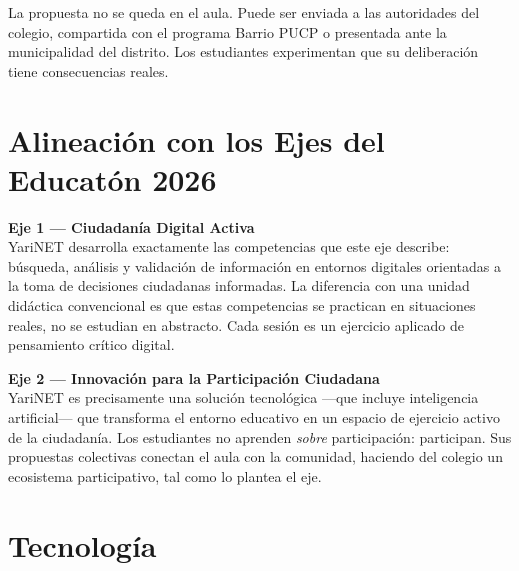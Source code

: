 \documentclass[a4paper, 11pt]{article}
\begin{document}
La propuesta no se queda en el aula. Puede ser enviada a las autoridades
del colegio, compartida con el programa Barrio PUCP o presentada ante
la municipalidad del distrito. Los estudiantes experimentan que su
deliberaci\'{o}n tiene consecuencias reales.

\section{Alineación con los Ejes del Educatón 2026}

\begin{tcolorbox}[
  enhanced,
  colback=ylightgray,
  colframe=ygold,
  arc=3mm,
  boxrule=1.2pt,
  left=12pt, right=12pt, top=10pt, bottom=10pt
]
\textbf{\color{yblue}Eje 1 — Ciudadan\'{i}a Digital Activa}\\[5pt]
{\color{ygray}
YariNET desarrolla exactamente las competencias que este eje describe:
b\'{u}squeda, an\'{a}lisis y validaci\'{o}n de informaci\'{o}n en entornos
digitales orientadas a la toma de decisiones ciudadanas informadas.
La diferencia con una unidad did\'{a}ctica convencional es que estas
competencias se practican en situaciones reales, no se estudian en abstracto.
Cada sesi\'{o}n es un ejercicio aplicado de pensamiento cr\'{i}tico digital.
}

\vspace{8pt}

\textbf{\color{yblue}Eje 2 — Innovaci\'{o}n para la Participaci\'{o}n Ciudadana}\\[5pt]
{\color{ygray}
YariNET es precisamente una soluci\'{o}n tecnol\'{o}gica ---que incluye
inteligencia artificial--- que transforma el entorno educativo en un espacio
de ejercicio activo de la ciudadan\'{i}a. Los estudiantes no aprenden
\textit{sobre} participaci\'{o}n: participan. Sus propuestas colectivas
conectan el aula con la comunidad, haciendo del colegio un ecosistema
participativo, tal como lo plantea el eje.
}
\end{tcolorbox}

\section{Tecnología}
\end{document}

